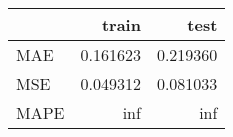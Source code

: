 \begin{tabular}{lrr}
\toprule
{} &     train &      test \\
\midrule
MAE  &  0.161623 &  0.219360 \\
MSE  &  0.049312 &  0.081033 \\
MAPE &       inf &       inf \\
\bottomrule
\end{tabular}
